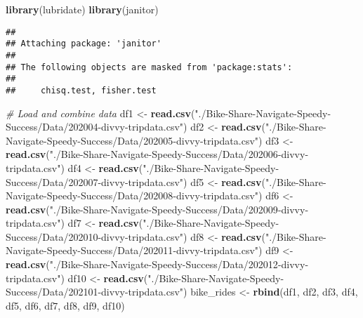 \documentclass[
]{article}
\newenvironment{Shaded}{\begin{snugshade}}{\end{snugshade}}
\newcommand{\CommentTok}[1]{\textcolor[rgb]{0.56,0.35,0.01}{\textit{#1}}}
\newcommand{\FunctionTok}[1]{\textcolor[rgb]{0.13,0.29,0.53}{\textbf{#1}}}
\newcommand{\NormalTok}[1]{#1}
\newcommand{\OtherTok}[1]{\textcolor[rgb]{0.56,0.35,0.01}{#1}}
\newcommand{\StringTok}[1]{\textcolor[rgb]{0.31,0.60,0.02}{#1}}
\begin{document}
\begin{Shaded}
\begin{Highlighting}[]
\FunctionTok{library}\NormalTok{(lubridate)}
\FunctionTok{library}\NormalTok{(janitor)}
\end{Highlighting}
\end{Shaded}

\begin{verbatim}
## 
## Attaching package: 'janitor'
## 
## The following objects are masked from 'package:stats':
## 
##     chisq.test, fisher.test
\end{verbatim}

\begin{Shaded}
\begin{Highlighting}[]
\CommentTok{\# Load and combine data}
\NormalTok{df1 }\OtherTok{\textless{}{-}} \FunctionTok{read.csv}\NormalTok{(}\StringTok{"./Bike{-}Share{-}Navigate{-}Speedy{-}Success/Data/202004{-}divvy{-}tripdata.csv"}\NormalTok{)}
\NormalTok{df2 }\OtherTok{\textless{}{-}} \FunctionTok{read.csv}\NormalTok{(}\StringTok{"./Bike{-}Share{-}Navigate{-}Speedy{-}Success/Data/202005{-}divvy{-}tripdata.csv"}\NormalTok{)}
\NormalTok{df3 }\OtherTok{\textless{}{-}} \FunctionTok{read.csv}\NormalTok{(}\StringTok{"./Bike{-}Share{-}Navigate{-}Speedy{-}Success/Data/202006{-}divvy{-}tripdata.csv"}\NormalTok{)}
\NormalTok{df4 }\OtherTok{\textless{}{-}} \FunctionTok{read.csv}\NormalTok{(}\StringTok{"./Bike{-}Share{-}Navigate{-}Speedy{-}Success/Data/202007{-}divvy{-}tripdata.csv"}\NormalTok{)}
\NormalTok{df5 }\OtherTok{\textless{}{-}} \FunctionTok{read.csv}\NormalTok{(}\StringTok{"./Bike{-}Share{-}Navigate{-}Speedy{-}Success/Data/202008{-}divvy{-}tripdata.csv"}\NormalTok{)}
\NormalTok{df6 }\OtherTok{\textless{}{-}} \FunctionTok{read.csv}\NormalTok{(}\StringTok{"./Bike{-}Share{-}Navigate{-}Speedy{-}Success/Data/202009{-}divvy{-}tripdata.csv"}\NormalTok{)}
\NormalTok{df7 }\OtherTok{\textless{}{-}} \FunctionTok{read.csv}\NormalTok{(}\StringTok{"./Bike{-}Share{-}Navigate{-}Speedy{-}Success/Data/202010{-}divvy{-}tripdata.csv"}\NormalTok{)}
\NormalTok{df8 }\OtherTok{\textless{}{-}} \FunctionTok{read.csv}\NormalTok{(}\StringTok{"./Bike{-}Share{-}Navigate{-}Speedy{-}Success/Data/202011{-}divvy{-}tripdata.csv"}\NormalTok{)}
\NormalTok{df9 }\OtherTok{\textless{}{-}} \FunctionTok{read.csv}\NormalTok{(}\StringTok{"./Bike{-}Share{-}Navigate{-}Speedy{-}Success/Data/202012{-}divvy{-}tripdata.csv"}\NormalTok{)}
\NormalTok{df10 }\OtherTok{\textless{}{-}} \FunctionTok{read.csv}\NormalTok{(}\StringTok{"./Bike{-}Share{-}Navigate{-}Speedy{-}Success/Data/202101{-}divvy{-}tripdata.csv"}\NormalTok{)}
\NormalTok{bike\_rides }\OtherTok{\textless{}{-}} \FunctionTok{rbind}\NormalTok{(df1, df2, df3, df4, df5, df6, df7, df8, df9, df10)}


\end{Highlighting}
\end{Shaded}
\end{document}
